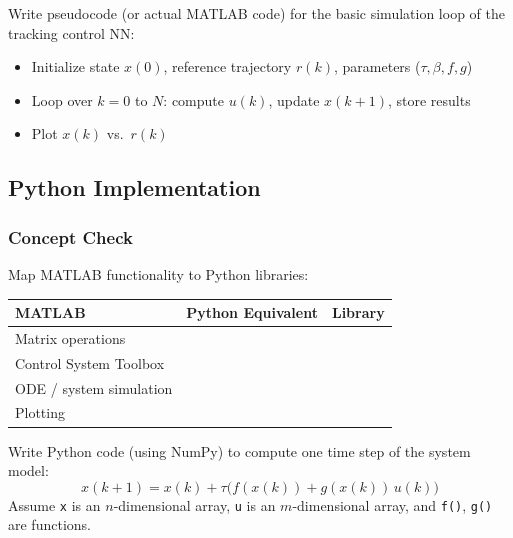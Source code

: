 Write pseudocode (or actual MATLAB code) for the basic simulation loop of the tracking control NN:
\begin{itemize}[nosep]
  \item Initialize state $x(0)$, reference trajectory $r(k)$, parameters ($\tau, \beta, f, g$)
  \item Loop over $k = 0$ to $N$: compute $u(k)$, update $x(k+1)$, store results
  \item Plot $x(k)$ vs.\ $r(k)$
\end{itemize}

\begin{codeanswer}\end{codeanswer}

\subsection{Python Implementation}

\subsubsection*{Concept Check}

Map MATLAB functionality to Python libraries:

\medskip
\begin{tabularx}{\textwidth}{l l X}
\toprule
\textbf{MATLAB} & \textbf{Python Equivalent} & \textbf{Library} \\
\midrule
Matrix operations       & & \\[0.6em]
Control System Toolbox  & & \\[0.6em]
ODE / system simulation & & \\[0.6em]
Plotting                & & \\
\bottomrule
\end{tabularx}

\begin{answerbox}\end{answerbox}

Write Python code (using NumPy) to compute one time step of the system model:
\[
  x(k+1) = x(k) + \tau\bigl(f(x(k)) + g(x(k))\,u(k)\bigr)
\]
Assume \texttt{x} is an $n$-dimensional array, \texttt{u} is an $m$-dimensional array, and \texttt{f()}, \texttt{g()} are functions.

\begin{codeanswer}\end{codeanswer}

